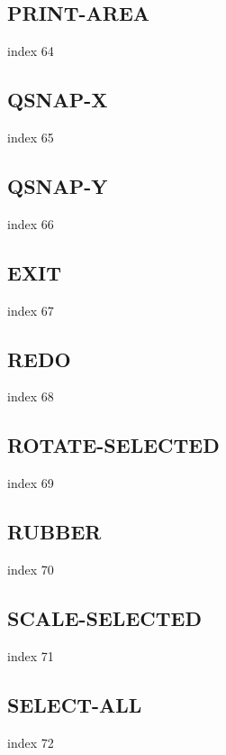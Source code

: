 \documentclass[a4paper]{report}
\begin{document}
\subsection{PRINT-AREA}

index 64

\subsection{QSNAP-X}

index 65

\subsection{QSNAP-Y}

index 66

\subsection{EXIT}

 index 67

\subsection{REDO}

index 68

\subsection{ROTATE-SELECTED}

index 69

\subsection{RUBBER}

index 70

\subsection{SCALE-SELECTED}

index 71

\subsection{SELECT-ALL}

index 72
\end{document}
